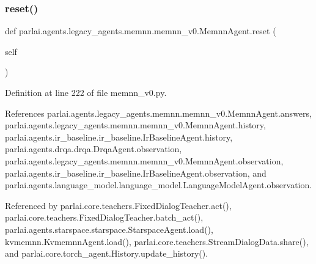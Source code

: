 \subsubsection{\texorpdfstring{reset()}{reset()}}
{\footnotesize\ttfamily def parlai.\+agents.\+legacy\+\_\+agents.\+memnn.\+memnn\+\_\+v0.\+Memnn\+Agent.\+reset (\begin{DoxyParamCaption}\item[{}]{self }\end{DoxyParamCaption})}



Definition at line 222 of file memnn\+\_\+v0.\+py.



References parlai.\+agents.\+legacy\+\_\+agents.\+memnn.\+memnn\+\_\+v0.\+Memnn\+Agent.\+answers, parlai.\+agents.\+legacy\+\_\+agents.\+memnn.\+memnn\+\_\+v0.\+Memnn\+Agent.\+history, parlai.\+agents.\+ir\+\_\+baseline.\+ir\+\_\+baseline.\+Ir\+Baseline\+Agent.\+history, parlai.\+agents.\+drqa.\+drqa.\+Drqa\+Agent.\+observation, parlai.\+agents.\+legacy\+\_\+agents.\+memnn.\+memnn\+\_\+v0.\+Memnn\+Agent.\+observation, parlai.\+agents.\+ir\+\_\+baseline.\+ir\+\_\+baseline.\+Ir\+Baseline\+Agent.\+observation, and parlai.\+agents.\+language\+\_\+model.\+language\+\_\+model.\+Language\+Model\+Agent.\+observation.



Referenced by parlai.\+core.\+teachers.\+Fixed\+Dialog\+Teacher.\+act(), parlai.\+core.\+teachers.\+Fixed\+Dialog\+Teacher.\+batch\+\_\+act(), parlai.\+agents.\+starspace.\+starspace.\+Starspace\+Agent.\+load(), kvmemnn.\+Kvmemnn\+Agent.\+load(), parlai.\+core.\+teachers.\+Stream\+Dialog\+Data.\+share(), and parlai.\+core.\+torch\+\_\+agent.\+History.\+update\+\_\+history().

